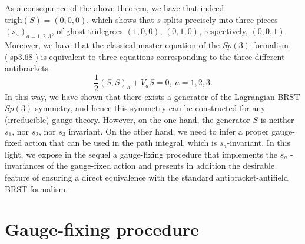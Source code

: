 \documentclass[a4paper,12pt]{article}
\begin{document}
As a consequence of the above theorem, we have that indeed $\mathrm{trigh}%
\left( S\right) =\left( 0,0,0\right) $, which shows that $s$ splits
precisely into three pieces $\left( s_{a}\right) _{a=1,2,3}$, of ghost
tridegrees $\left( 1,0,0\right) $, $\left( 0,1,0\right) $, respectively, $%
\left( 0,0,1\right) $. Moreover, we have that the classical master equation
of the $Sp(3)$ formalism (\ref{sp3.68}) is equivalent to three equations
corresponding to the three different antibrackets 
\begin{equation}
\frac{1}{2}\left( S,S\right) _{a}+V_{a}S=0,\;a=1,2,3.  \label{sp3.82}
\end{equation}
In this way, we have shown that there exists a generator of the Lagrangian
BRST $Sp\left( 3\right) $ symmetry, and hence this symmetry can be
constructed for any (irreducible) gauge theory. However, on the one hand,
the generator $S$ is neither $s_{1}$, nor $s_{2}$, nor $s_{3}$ invariant. On
the other hand, we need to infer a proper gauge-fixed action that can be
used in the path integral, which is $s_{a}$-invariant. In this light, we
expose in the sequel a gauge-fixing procedure that implements the $s_{a}$%
-invariances of the gauge-fixed action and presents in addition the
desirable feature of ensuring a direct equivalence with the standard
antibracket-antifield BRST formalism.

\section{Gauge-fixing procedure}
\end{document}
